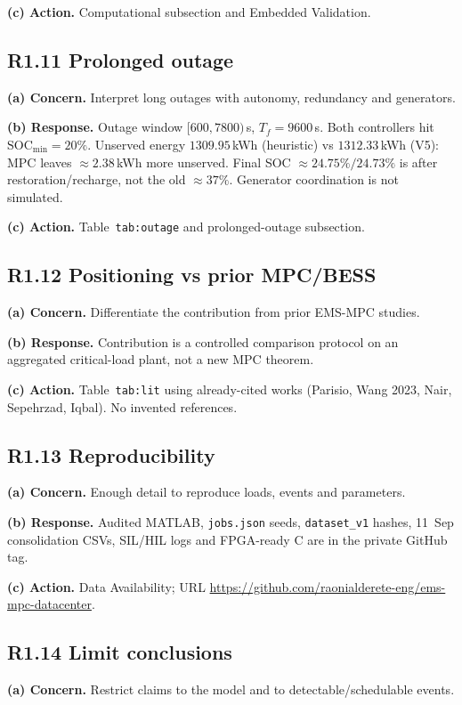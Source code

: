 \documentclass[11pt]{article}
\newcommand{\repgithub}{https://github.com/raonialderete-eng/ems-mpc-datacenter}
\begin{document}
\textbf{(c) Action.} Computational subsection and Embedded Validation.

\subsection*{R1.11 Prolonged outage}
\textbf{(a) Concern.} Interpret long outages with autonomy, redundancy and generators.

\textbf{(b) Response.} Outage window $[600,7800)$\,s, $T_f=9600$\,s. Both controllers hit $\mathrm{SOC}_{\min}=20\%$. Unserved energy $1309.95$\,kWh (heuristic) vs $1312.33$\,kWh (V5): MPC leaves $\approx 2.38$\,kWh more unserved. Final SOC $\approx 24.75\%/24.73\%$ is after restoration/recharge, not the old $\approx 37\%$. Generator coordination is not simulated.

\textbf{(c) Action.} Table~\texttt{tab:outage} and prolonged-outage subsection.

\subsection*{R1.12 Positioning vs prior MPC/BESS}
\textbf{(a) Concern.} Differentiate the contribution from prior EMS-MPC studies.

\textbf{(b) Response.} Contribution is a controlled comparison protocol on an aggregated critical-load plant, not a new MPC theorem.

\textbf{(c) Action.} Table~\texttt{tab:lit} using already-cited works (Parisio, Wang 2023, Nair, Sepehrzad, Iqbal). No invented references.

\subsection*{R1.13 Reproducibility}
\textbf{(a) Concern.} Enough detail to reproduce loads, events and parameters.

\textbf{(b) Response.} Audited MATLAB, \texttt{jobs.json} seeds, \texttt{dataset\_v1} hashes, 11~Sep consolidation CSVs, SIL/HIL logs and FPGA-ready C are in the private GitHub tag.

\textbf{(c) Action.} Data Availability; URL \url{\repgithub}.

\subsection*{R1.14 Limit conclusions}
\textbf{(a) Concern.} Restrict claims to the model and to detectable/schedulable events.
\end{document}
